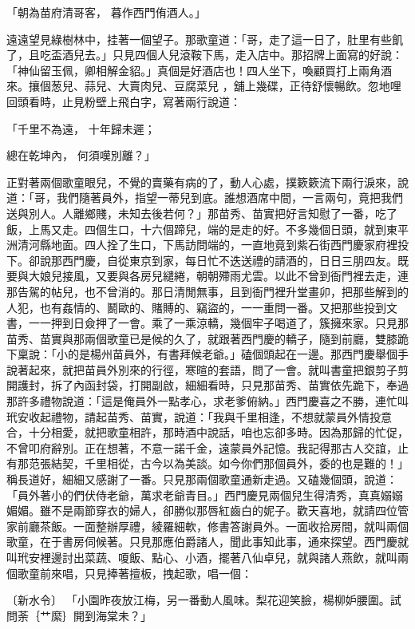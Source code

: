 \begin{showcontents}{}
「朝為苗府清哥客，  暮作西門侑酒人。」

遠遠望見綠樹林中，挂著一個望子。那歌童道：「哥，走了這一日了，肚里有些飢了，且吃盃酒兒去。」只見四個人兒滾鞍下馬，走入店中。那招牌上面寫的好說：「神仙留玉佩，卿相解金貂。」真個是好酒店也！四人坐下，喚顧買打上兩角酒來。攘個葱兒、蒜兒、大賣肉兒、豆腐菜兒 ，舖上幾碟，正待舒懷暢飲。忽地哩回頭看時，止見粉壁上飛白字，寫著兩行說道：

「千里不為遠，  十年歸未遲；

總在乾坤內，  何須嘆別離？」

正對著兩個歌童眼兒，不覺的賣藥有病的了，動人心處，撲簌簌流下兩行淚來，說道：「哥，我們隨著員外，指望一蒂兒到底。誰想酒席中間，一言兩句，竟把我們送與別人。人離鄉賤，未知去後若何？」那苗秀、苗實把好言知慰了一番，吃了飯，上馬又走。四個生口，十六個蹄兒，端的是走的好。不多幾個日頭，就到東平洲清河縣地面。四人拴了生口，下馬訪問端的，一直地竟到紫石街西門慶家府裡投下。卻說那西門慶，自從東京到家，每日忙不迭送禮的請酒的，日日三朋四友。既要與大娘兒接風，又要與各房兒繾綣，朝朝殢雨尤雲。以此不曾到衙門裡去走，連那告駕的帖兒，也不曾消的。那日清閒無事，且到衙門裡升堂畫卯，把那些解到的人犯，也有姦情的、鬭歐的、賭賻的、竊盜的，一一重問一番。又把那些投到文書，一一押到日僉押了一會。乘了一乘涼轎，幾個牢子喝道了，簇擁來家。只見那苗秀、苗實與那兩個歌童已是候的久了，就跟著西門慶的轎子，隨到前廳，雙膝跪下稟說：「小的是楊州苗員外，有書拜候老爺。」磕個頭起在一邊。那西門慶舉個手說著起來，就把苗員外別來的行徑，寒暄的套語，問了一會。就叫書童把銀剪子剪開護封，拆了內函封袋，打開副啟，細細看時，只見那苗秀、苗實依先跪下，奉過那許多禮物說道：「這是俺員外一點孝心，求老爹俯納。」西門慶喜之不勝，連忙叫玳安收起禮物，請起苗秀、苗實，說道：「我與千里相逢，不想就蒙員外情投意合，十分相愛，就把歌童相許，那時酒中說話，咱也忘卻多時。因為那歸的忙促，不曾叩府辭別。正在想著，不意一諾千金，遠蒙員外記憶。我記得那古人交誼，止有那范張結契，千里相從，古今以為美談。如今你們那個員外，委的也是難的！」稱長道好，細細又感謝了一番。只見那兩個歌童通新走過。又磕幾個頭，說道：「員外著小的們伏侍老爺，萬求老爺青目。」西門慶見兩個兒生得清秀，真真嫋嫋媚媚。雖不是兩節穿衣的婦人，卻勝似那唇紅齒白的妮子。歡天喜地，就請四位管家前廳茶飯。一面整辦厚禮，綾羅細軟，修書答謝員外。一面收拾房間，就叫兩個歌童，在于書房伺候著。只見那應伯爵諸人，聞此事知此事，通來探望。西門慶就叫玳安裡邊討出菜蔬、嗄飯、點心、小酒，擺著八仙卓兒，就與諸人燕飲，就叫兩個歌童前來唱，只見捧著擅板，拽起歌，唱一個：

〔新水令〕  「小園昨夜放江梅，另一番動人風味。梨花迎笑臉，楊柳妒腰圍。試問荼｛艹縻｝開到海棠未？」


\end{showcontents}

